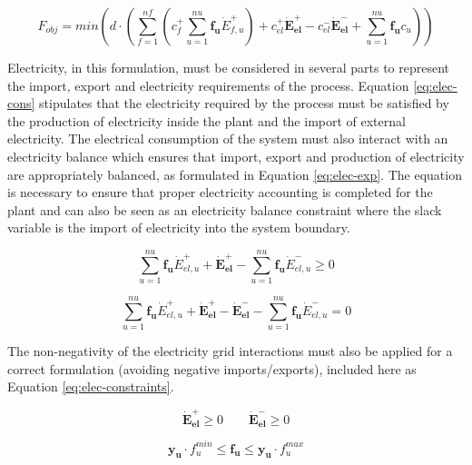 \begin{equation}\label{eq:HC_obj}
F_{obj} = min (d \cdot (\sum_{f=1}^{nf} (c_{f}^+  \sum_{u=1}^{nu} \boldsymbol{f_u} \dot{E}_{f,u}^+) + c_{el}^{+} \boldsymbol{\dot{E}_{el}^+} - c_{el}^{-} \boldsymbol{\dot{E}_{el}^-} +  \sum_{u=1}^{nu} \boldsymbol {f_u} c_{u} )) 
\end{equation}

Electricity, in this formulation, must be considered in several parts to represent the import, export and electricity requirements of the process. Equation \ref{eq:elec-cons} stipulates that the electricity required by the process must be satisfied by the production of electricity inside the plant and the import of external electricity. The electrical consumption of the system must also interact with an electricity balance which ensures that import, export and production of electricity are appropriately balanced, as formulated in Equation \ref{eq:elec-exp}. The equation is necessary to ensure that proper electricity accounting is completed for the plant and can also be seen as an electricity balance constraint where the slack variable is the import of electricity into the system boundary.
   
\begin{equation}\label{eq:elec-cons}
\sum_{u=1}^{nu} \boldsymbol {f_{u}} \dot{E}_{el,u}^+ + \boldsymbol {\dot{E}_{el}^+} - \sum_{u=1}^{nu} \boldsymbol {f_{u}} \dot{E}_{el,u}^- \geq 0
\end{equation}

\begin{equation}
\label{eq:elec-exp}
\sum_{u=1}^{nu} \boldsymbol {f_{u}} \dot{E}_{el,u}^+ + \boldsymbol {\dot{E}_{el}^+} - \boldsymbol {\dot{E}_{el}^-} - \sum_{u=1}^{nu} \boldsymbol {f_{u}} \dot{E}_{el,u}^- = 0
\end{equation}

The non-negativity of the electricity grid interactions must also be applied for a correct formulation (avoiding negative imports/exports), included here as Equation \ref{eq:elec-constraints}.

\begin{equation}
\label{eq:elec-constraints}
\boldsymbol {\dot{E}_{el}^+}  \geq 0 ~~~~~~~~~ \boldsymbol {\dot{E}_{el}^-} \geq 0
\end{equation}

\begin{equation}
\label{eq:mult-max}
\boldsymbol {y_{u}} \cdot f_{u}^{min} \leq \boldsymbol {f_{u}} \leq \boldsymbol {y_{u}} \cdot f_{u}^{max} 
\end{equation}


